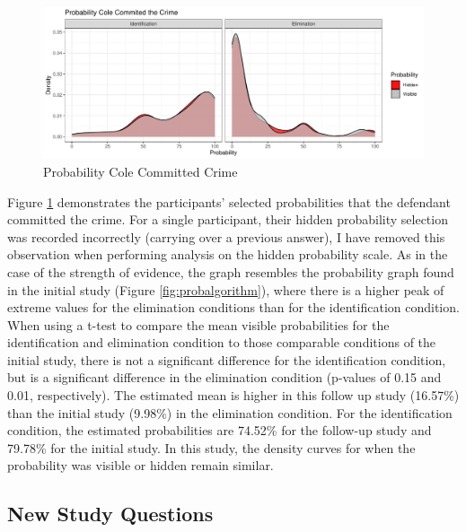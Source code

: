 \documentclass[print]{nuthesis}
\begin{document}
\begin{figure}

{\centering \includegraphics[width=\linewidth]{thesis_files/figure-latex/prob2-1} 

}

\caption{Probability Cole Committed Crime}\label{fig:prob2}
\end{figure}

Figure \ref{fig:prob2} demonstrates the participants' selected probabilities that the defendant committed the crime.
For a single participant, their hidden probability selection was recorded incorrectly (carrying over a previous answer), I have removed this observation when performing analysis on the hidden probability scale.
As in the case of the strength of evidence, the graph resembles the probability graph found in the initial study (Figure \ref{fig:probalgorithm}), where there is a higher peak of extreme values for the elimination conditions than for the identification condition.
When using a t-test to compare the mean visible probabilities for the identification and elimination condition to those comparable conditions of the initial study, there is not a significant difference for the identification condition, but is a significant difference in the elimination condition (p-values of 0.15 and 0.01, respectively).
The estimated mean is higher in this follow up study (16.57\%) than the initial study (9.98\%) in the elimination condition.
For the identification condition, the estimated probabilities are 74.52\% for the follow-up study and 79.78\% for the initial study.
In this study, the density curves for when the probability was visible or hidden remain similar.

\hypertarget{new-study-questions}{%
\subsection{New Study Questions}\label{new-study-questions}}
\end{document}
